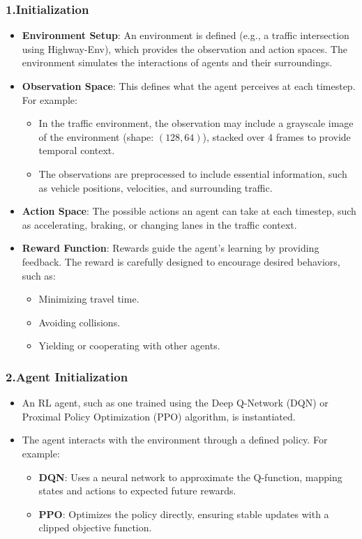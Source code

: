 \subsubsection{1.Initialization}
\begin{itemize}
    \item \textbf{Environment Setup}: An environment is defined (e.g., a traffic intersection using Highway-Env), which provides the observation and action spaces. The environment simulates the interactions of agents and their surroundings.
    \item \textbf{Observation Space}: This defines what the agent perceives at each timestep. For example:
    \begin{itemize}
        \item In the traffic environment, the observation may include a grayscale image of the environment (shape: \((128, 64)\)), stacked over 4 frames to provide temporal context.
        \item The observations are preprocessed to include essential information, such as vehicle positions, velocities, and surrounding traffic.
    \end{itemize}
    \item \textbf{Action Space}: The possible actions an agent can take at each timestep, such as accelerating, braking, or changing lanes in the traffic context.
    \item \textbf{Reward Function}: Rewards guide the agent's learning by providing feedback. The reward is carefully designed to encourage desired behaviors, such as:
    \begin{itemize}
        \item Minimizing travel time.
        \item Avoiding collisions.
        \item Yielding or cooperating with other agents.
    \end{itemize}
\end{itemize}

\subsubsection{2.Agent Initialization}
\begin{itemize}
    \item An RL agent, such as one trained using the Deep Q-Network (DQN) or Proximal Policy Optimization (PPO) algorithm, is instantiated.
    \item The agent interacts with the environment through a defined policy. For example:
    \begin{itemize}
        \item \textbf{DQN}: Uses a neural network to approximate the Q-function, mapping states and actions to expected future rewards.
        \item \textbf{PPO}: Optimizes the policy directly, ensuring stable updates with a clipped objective function.
    \end{itemize}
\end{itemize}


